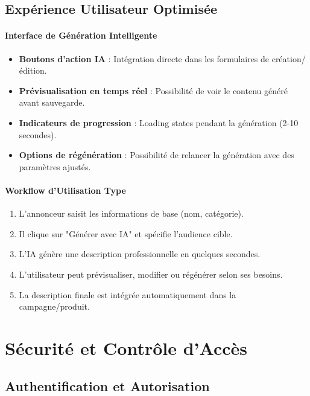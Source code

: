 \subsection{Expérience Utilisateur Optimisée}

\paragraph{Interface de Génération Intelligente}
\begin{itemize}[label=\textbullet]
    \item \textbf{Boutons d'action IA} : Intégration directe dans les formulaires de création/édition.
    \item \textbf{Prévisualisation en temps réel} : Possibilité de voir le contenu généré avant sauvegarde.
    \item \textbf{Indicateurs de progression} : Loading states pendant la génération (2-10 secondes).
    \item \textbf{Options de régénération} : Possibilité de relancer la génération avec des paramètres ajustés.
\end{itemize}

\paragraph{Workflow d'Utilisation Type}
\begin{enumerate}
    \item L'annonceur saisit les informations de base (nom, catégorie).
    \item Il clique sur "Générer avec IA" et spécifie l'audience cible.
    \item L'IA génère une description professionnelle en quelques secondes.
    \item L'utilisateur peut prévisualiser, modifier ou régénérer selon ses besoins.
    \item La description finale est intégrée automatiquement dans la campagne/produit.
\end{enumerate}

\section{Sécurité et Contrôle d'Accès}

\subsection{Authentification et Autorisation}

